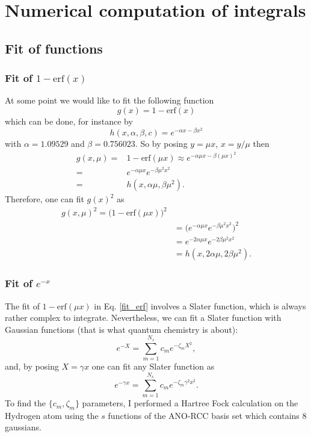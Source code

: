 \documentclass[aip,jcp,reprint,noshowkeys,superscriptaddress]{revtex4-1}
\begin{document}
\section{Numerical computation of integrals}
\subsection{Fit of functions}
\subsubsection{Fit of $1-\text{erf}(x)$}
At some point we would like to fit the following function
\begin{equation}
 g(x) = 1-\text{erf}(x)
\end{equation}
which can be done, for instance by 
\begin{equation}
 h(x,\alpha,\beta,c) = e^{-\alpha x - \beta x^2}
\end{equation}
with $\alpha=1.09529$ and $\beta = 0.756023$. 
So by posing $y=\mu x$, $x=y/\mu$ then
\begin{equation}
 \label{fit_erf}
 \begin{aligned}
  g(x,\mu)  =& 1 - \text{erf}(\mu x) \approx e^{-\alpha \mu x - \beta (\mu x)^2}\\ 
        =& e^{-\alpha \mu x } e^{-\beta \mu^2 x^2} \\
        =& h(x,\alpha \mu, \beta \mu^2).
 \end{aligned}
\end{equation}
Therefore, one can fit $g(x)^2$ as 
\begin{equation}
 \begin{aligned}
 g(x,\mu)^2 = \bigg( 1 - \text{erf}(\mu x) \bigg)^2\\
           &= \bigg( e^{-\alpha \mu x } e^{-\beta \mu^2 x^2}\bigg)^2 \\
           &= e^{-2\alpha  \mu x } e^{-2 \beta \mu^2 x^2} \\
           &= h(x,2 \alpha \mu, 2 \beta \mu^2).
 \end{aligned}
\end{equation}

\subsubsection{Fit of $e^{-x}$}
The fit of $1 - \text{erf}(\mu x)$ in Eq. \eqref{fit_erf} involves a Slater function, which is always rather complex to integrate. 
Nevertheless, we can fit a Slater function with Gaussian functions (that is what quantum chemistry is about):
\begin{equation}
 e^{-X} = \sum_{m=1}^{N_s} c_m e^{-\zeta_m X^2}, 
\end{equation}
and, by posing $X=\gamma x$ one can fit any Slater function as
\begin{equation}
 e^{-\gamma x} = \sum_{m=1}^{N_s} c_m e^{-\zeta_m \gamma^2 x^2}. 
\end{equation}
To find the $\{c_m,\zeta_m\}$ parameters, I performed a Hartree Fock calculation on the Hydrogen atom using the $s$ functions of the ANO-RCC basis set which contains 8 gaussians.  
\end{document}
